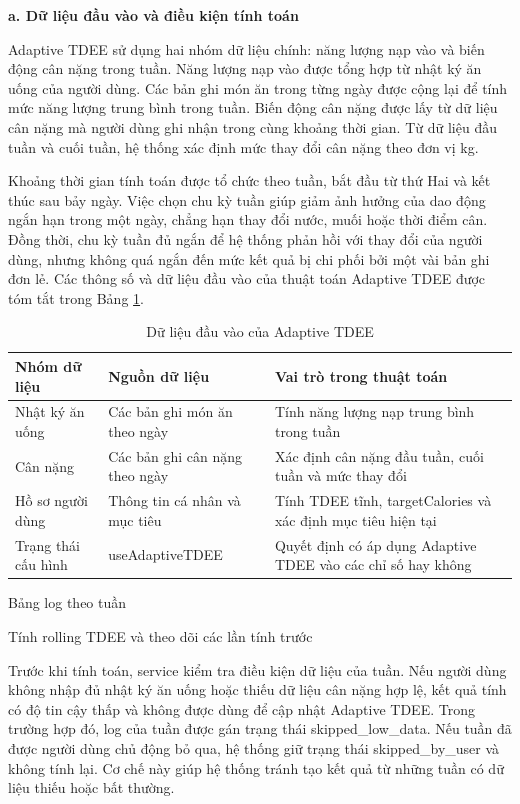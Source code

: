 \documentclass[12pt, a4paper]{report}
\begin{document}
\textbf{a. Dữ liệu đầu vào và điều kiện tính toán}

Adaptive TDEE sử dụng hai nhóm dữ liệu chính: năng lượng nạp vào và biến động cân nặng trong tuần. Năng lượng nạp vào được tổng hợp từ nhật ký ăn uống của người dùng. Các bản ghi món ăn trong từng ngày được cộng lại để tính mức năng lượng trung bình trong tuần. Biến động cân nặng được lấy từ dữ liệu cân nặng mà người dùng ghi nhận trong cùng khoảng thời gian. Từ dữ liệu đầu tuần và cuối tuần, hệ thống xác định mức thay đổi cân nặng theo đơn vị kg.

Khoảng thời gian tính toán được tổ chức theo tuần, bắt đầu từ thứ Hai và kết thúc sau bảy ngày. Việc chọn chu kỳ tuần giúp giảm ảnh hưởng của dao động ngắn hạn trong một ngày, chẳng hạn thay đổi nước, muối hoặc thời điểm cân. Đồng thời, chu kỳ tuần đủ ngắn để hệ thống phản hồi với thay đổi của người dùng, nhưng không quá ngắn đến mức kết quả bị chi phối bởi một vài bản ghi đơn lẻ. Các thông số và dữ liệu đầu vào của thuật toán Adaptive TDEE được tóm tắt trong Bảng \ref{tab:adaptive_tdee_io}.

\begin{table}[htbp]
\centering
\caption{Dữ liệu đầu vào của Adaptive TDEE}
\label{tab:adaptive_tdee_io}
\begin{tabular}{|>{\raggedright\arraybackslash}p{4cm}|>{\raggedright\arraybackslash}p{4cm}|p{7cm}|}
\hline
\textbf{Nhóm dữ liệu} & \textbf{Nguồn dữ liệu} & \textbf{Vai trò trong thuật toán} \\
\hline
Nhật ký ăn uống & Các bản ghi món ăn theo ngày & Tính năng lượng nạp trung bình trong tuần \\
\hline
Cân nặng & Các bản ghi cân nặng theo ngày & Xác định cân nặng đầu tuần, cuối tuần và mức thay đổi \\
\hline
Hồ sơ người dùng & Thông tin cá nhân và mục tiêu & Tính TDEE tĩnh, targetCalories và xác định mục tiêu hiện tại \\
\hline
Trạng thái cấu hình & useAdaptiveTDEE & Quyết định có áp dụng Adaptive TDEE vào các chỉ số hay không \\
\hline
\end{tabular}
\end{table}

Bảng log theo tuần

Tính rolling TDEE và theo dõi các lần tính trước

Trước khi tính toán, service kiểm tra điều kiện dữ liệu của tuần. Nếu người dùng không nhập đủ nhật ký ăn uống hoặc thiếu dữ liệu cân nặng hợp lệ, kết quả tính có độ tin cậy thấp và không được dùng để cập nhật Adaptive TDEE. Trong trường hợp đó, log của tuần được gán trạng thái skipped\_low\_data. Nếu tuần đã được người dùng chủ động bỏ qua, hệ thống giữ trạng thái skipped\_by\_user và không tính lại. Cơ chế này giúp hệ thống tránh tạo kết quả từ những tuần có dữ liệu thiếu hoặc bất thường.
\end{document}
